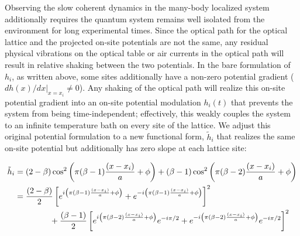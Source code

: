 Observing the slow coherent dynamics in the many-body localized system additionally requires the quantum system remains well isolated from the environment for long experimental times. Since the optical path for the optical lattice and the projected on-site potentials are not the same, any residual physical vibrations on the optical table or air currents in the optical path will result in relative shaking between the two potentials. In the bare formulation of $h_i$, as written above, some sites additionally have a non-zero potential gradient ($d h(x)/dx \rvert_{x=x_i} \neq 0$). Any shaking of the optical path will realize this on-site potential gradient into an on-site potential modulation $h_i(t)$ that prevents the system from being time-independent; effectively, this weakly couples the system to an infinite temperature bath on every site of the lattice. We adjust this original potential formulation to a new functional form, $\tilde{h}_i$ that realizes the same on-site potential but additionally has zero slope at each lattice site:

%
\begin{equation}
\begin{aligned}
\tilde{h}_i & = (2-\beta) \cos^2 \left ( \pi (\beta - 1) \frac{(x-x_i)}{a} + \phi \right ) + (\beta - 1) \cos^2 \left ( \pi (\beta - 2) \frac{(x-x_i)}{a} + \phi \right ) \\
&= \frac{(2-\beta)}{2} \left [ e^{i \left (\pi (\beta - 1)  \frac{(x-x_i)}{a} + \phi  \right )} +  e^{-i \left (\pi (\beta - 1)  \frac{(x-x_i)}{a} + \phi  \right )} \right ]^2 \\
& \hspace{15mm} + \frac{(\beta-1)}{2} \left [ e^{i \left (\pi (\beta - 2)  \frac{(x-x_i)}{a} + \phi  \right )}e^{-i\pi/2} +  e^{-i \left (\pi (\beta - 2)  \frac{(x-x_i)}{a} + \phi  \right )}e^{-i\pi/2} \right ]^2
\end{aligned}
\label{eqn:vdis}
\end{equation}


